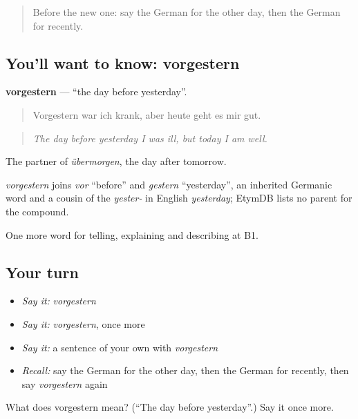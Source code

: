 \label{lesson:GE-C264-vorgestern}



\begin{quote}
Before the new one: say the German for the other day, then the German for recently.
\end{quote}

\subsection*{You'll want to know: vorgestern}
\textbf{vorgestern} — \textquotedblleft{}the day before yesterday\textquotedblright{}.

\begin{quote}
Vorgestern war ich krank, aber heute geht es mir gut.
\end{quote}

\begin{quote}
\emph{The day before yesterday I was ill, but today I am well.}
\end{quote}

The partner of \emph{übermorgen}, the day after tomorrow.

\begin{cousinweb}
\emph{vorgestern} joins \emph{vor} \textquotedblleft{}before\textquotedblright{} and \emph{gestern} \textquotedblleft{}yesterday\textquotedblright{}, an inherited Germanic word and a cousin of the \emph{yester-} in English \emph{yesterday}; EtymDB lists no parent for the compound.
\end{cousinweb}

\begin{grammarlens}[title={What you've built}]
One more word for telling, explaining and describing at B1.
\end{grammarlens}

\subsection*{Your turn}
\begin{itemize}
\raggedright
  \item \emph{Say it:} \emph{vorgestern}
  \item \emph{Say it:} \emph{vorgestern}, once more
  \item \emph{Say it:} a sentence of your own with \emph{vorgestern}
  \item \emph{Recall:} say the German for the other day, then the German for recently, then say \emph{vorgestern} again
\end{itemize}

\begin{tcolorbox}[breakable,colback=teal!4,colframe=teal!35!black,title={Before you move on}]
What does vorgestern mean? (\textquotedblleft{}The day before yesterday\textquotedblright{}.) Say it once more.
\end{tcolorbox}
